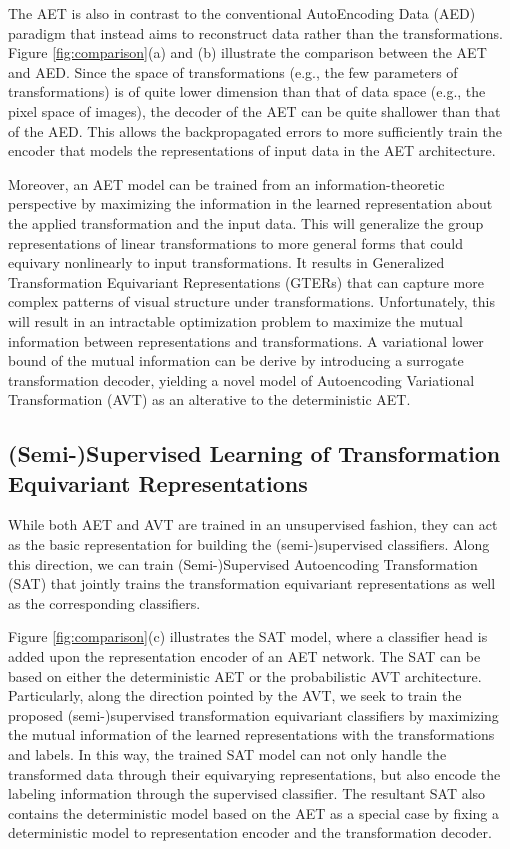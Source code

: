 \documentclass[10pt,journal,compsoc,twoside]{IEEEtran}
\begin{document}
The AET is also in contrast to the conventional AutoEncoding Data (AED) paradigm that instead aims to reconstruct data rather than the transformations. Figure \ref{fig:comparison}(a) and (b) illustrate the comparison between the AET and AED. Since the space of transformations (e.g., the few parameters of transformations) is of quite lower dimension than that of data space (e.g., the pixel space of images), the decoder of the AET can be quite shallower than that of the AED. This allows the backpropagated errors to more sufficiently train the encoder that models the representations of input data in the AET architecture.

Moreover, an AET model can be trained from an information-theoretic perspective by maximizing the information in the learned representation about the applied transformation and the input data. This will generalize the group representations of linear transformations to more general forms that could equivary nonlinearly to input transformations. It results in Generalized Transformation Equivariant Representations (GTERs) that can capture more complex patterns of visual structure under transformations. Unfortunately, this will result in an intractable optimization problem to maximize the mutual information between representations and transformations. A variational lower bound of the mutual information can be derive by introducing a surrogate transformation decoder, yielding a novel model of Autoencoding Variational Transformation (AVT) as an alterative to the deterministic AET.






\subsection{(Semi-)Supervised Learning of Transformation Equivariant Representations}


While both AET and AVT are trained in an unsupervised fashion, they can act as the basic representation for building the (semi-)supervised classifiers. Along this direction, we can train (Semi-)Supervised Autoencoding Transformation (SAT) that jointly trains the transformation equivariant representations as well as the corresponding classifiers.

Figure \ref{fig:comparison}(c) illustrates the SAT model, where a classifier head is added upon the representation encoder of an AET network.  The SAT can be based on either the deterministic AET or the probabilistic AVT architecture. Particularly, along the direction pointed by the AVT, we seek to train the proposed (semi-)supervised transformation equivariant classifiers by maximizing the mutual information of the learned representations with the transformations and labels. In this way, the trained SAT model can not only handle the transformed data through their equivarying representations, but also encode the labeling information through the supervised classifier. The resultant SAT also contains the deterministic model based on the AET as a special case by fixing a deterministic model to representation encoder and the transformation decoder.
\end{document}
